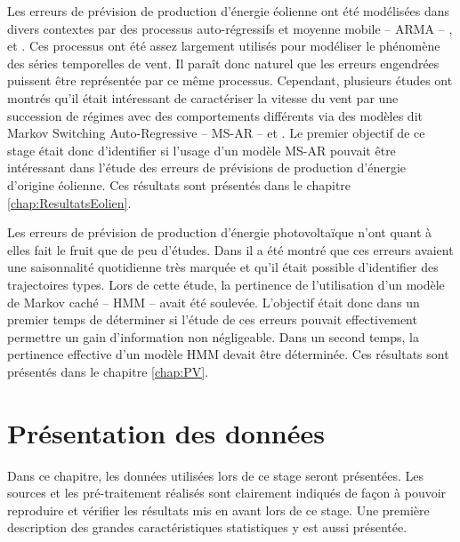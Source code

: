 \documentclass[12pt, french]{report}
\begin{document}

Les erreurs de prévision de production d'énergie éolienne ont été modélisées dans divers contextes par des processus auto-régressifs et moyenne mobile -- ARMA -- \cite{haessig_dimensionnement_2014}, \cite{wang_modeling_2018} et \cite{mello_optimized_2011}. Ces processus ont été assez largement utilisés pour modéliser le phénomène des séries temporelles de vent. Il paraît donc naturel que les erreurs engendrées puissent être représentée par ce même processus. Cependant, plusieurs études ont montrés qu'il était intéressant de caractériser la vitesse du vent par une succession de régimes avec des comportements différents via des modèles dit Markov Switching Auto-Regressive -- MS-AR -- \cite{ailliot_markov-switching_2012} \cite{pinson_adaptive_2012} et \cite{yoder_short-term_2013}. Le premier objectif de ce stage était donc d'identifier si l'usage d'un modèle MS-AR pouvait être intéressant dans l'étude des erreurs de prévisions de production d'énergie d'origine éolienne. Ces résultats sont présentés dans le chapitre \ref{chap:ResultatsEolien}.

Les erreurs de prévision de production d'énergie photovoltaïque n'ont quant à elles fait le fruit que de peu d'études. Dans \cite{latimier_gestion_2016} il a été montré que ces erreurs avaient une saisonnalité quotidienne très marquée et qu'il était possible d'identifier des trajectoires types. Lors de cette étude, la pertinence de l'utilisation d'un modèle de Markov caché -- HMM -- avait été soulevée. L'objectif était donc dans un premier temps de déterminer si l'étude de ces erreurs pouvait effectivement permettre un gain d'information non négligeable. Dans un second temps, la pertinence effective d'un modèle HMM devait être déterminée. Ces résultats sont présentés dans le chapitre \ref{chap:PV}.




\chapter{Présentation des données}
Dans ce chapitre, les données utilisées lors de ce stage seront présentées. Les sources et les pré-traitement réalisés sont clairement indiqués de façon à pouvoir reproduire et vérifier les résultats mis en avant lors de ce stage. Une première description des grandes caractéristiques statistiques y est aussi présentée. 
\end{document}
